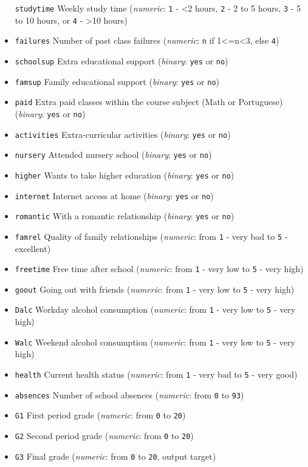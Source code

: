 \documentclass[
]{book}
\begin{document}
\begin{itemize}
  \texttt{studytime} Weekly study time (\emph{numeric}: \texttt{1} - \textless2 hours, \texttt{2} - 2 to 5 hours, \texttt{3} - 5 to 10 hours, or \texttt{4} - \textgreater10 hours)
\item
  \texttt{failures} Number of past class failures (\emph{numeric}: \texttt{n} if 1\textless=n\textless3, else \texttt{4})
\item
  \texttt{schoolsup} Extra educational support (\emph{binary}: \texttt{yes} or \texttt{no})
\item
  \texttt{famsup} Family educational support (\emph{binary}: \texttt{yes} or \texttt{no})
\item
  \texttt{paid} Extra paid classes within the course subject (Math or Portuguese) (\emph{binary}: \texttt{yes} or \texttt{no})
\item
  \texttt{activities} Extra-curricular activities (\emph{binary}: \texttt{yes} or \texttt{no})
\item
  \texttt{nursery} Attended nursery school (\emph{binary}: \texttt{yes} or \texttt{no})
\item
  \texttt{higher} Wants to take higher education (\emph{binary}: \texttt{yes} or \texttt{no})\\
\item
  \texttt{internet} Internet access at home (\emph{binary}: \texttt{yes} or \texttt{no})\\
\item
  \texttt{romantic} With a romantic relationship (\emph{binary}: \texttt{yes} or \texttt{no})\\
\item
  \texttt{famrel} Quality of family relationships (\emph{numeric}: from \texttt{1} - very bad to \texttt{5} - excellent)
\item
  \texttt{freetime} Free time after school (\emph{numeric}: from \texttt{1} - very low to \texttt{5} - very high)\\
\item
  \texttt{goout} Going out with friends (\emph{numeric}: from \texttt{1} - very low to \texttt{5} - very high)\\
\item
  \texttt{Dalc} Workday alcohol consumption (\emph{numeric}: from \texttt{1} - very low to \texttt{5} - very high)
\item
  \texttt{Walc} Weekend alcohol consumption (\emph{numeric}: from \texttt{1} - very low to \texttt{5} - very high)
\item
  \texttt{health} Current health status (\emph{numeric}: from \texttt{1} - very bad to \texttt{5} - very good)\\
\item
  \texttt{absences} Number of school absences (\emph{numeric}: from \texttt{0} to \texttt{93})\\
\item
  \texttt{G1} First period grade (\emph{numeric}: from \texttt{0} to \texttt{20})
\item
  \texttt{G2} Second period grade (\emph{numeric}: from \texttt{0} to \texttt{20})
\item
  \texttt{G3} Final grade (\emph{numeric}: from \texttt{0} to \texttt{20}, output target)
\end{itemize}
\end{document}
